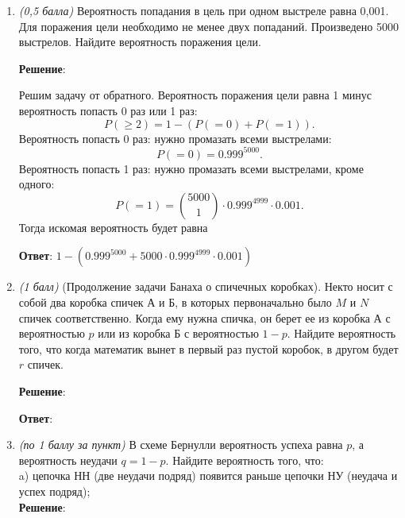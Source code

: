 \documentclass{article}
\begin{document}
\begin{enumerate}

    \item \textit{(0,5 балла)} Вероятность попадания в цель при одном выстреле равна 0,001. Для поражения цели необходимо не менее двух попаданий. Произведено 5000 выстрелов. Найдите вероятность поражения цели.
    
    \textbf{Решение}:

    Решим задачу от обратного. Вероятность поражения цели равна 1 минус вероятность попасть 0 раз или 1 раз:
    \begin{equation}
        P(\geq 2) = 1 - (P(=0) + P(=1)).
    \end{equation}
    Вероятность попасть 0 раз: нужно промазать всеми выстрелами:
    \begin{equation}
        P(=0) = 0.999^{5000}.
    \end{equation}
    Вероятность попасть 1 раз: нужно промазать всеми выстрелами, кроме одного:
    \begin{equation}
        P(=1) = \binom{5000}{1} \cdot 0.999^{4999} \cdot 0.001.
    \end{equation}
    Тогда искомая вероятность будет равна

    \textbf{Ответ}:
    $1 - (0.999^{5000} + 5000 \cdot 0.999^{4999} \cdot 0.001)$
    
    \item \textit{(1 балл)} (Продолжение задачи Банаха о спичечных коробках). Некто носит с собой два коробка спичек А и Б, в которых первоначально было $M$ и $N$ спичек соответственно. Когда ему нужна спичка, он берет ее из коробка А с вероятностью $p$ или из коробка Б с вероятностью $1-p$. Найдите вероятность того, что когда математик вынет в первый раз пустой коробок, в другом будет $r$ спичек.
    
    \textbf{Решение}:





    \textbf{Ответ}:
    
    \item \textit{(по 1 баллу за пункт)}  В схеме Бернулли вероятность успеха равна $p$, а вероятность неудачи $q = 1-p$. Найдите вероятность того, что:\\
    a) цепочка НН (две неудачи подряд) появится раньше цепочки НУ (неудача и успех подряд);\\

    \textbf{Решение}:






\end{enumerate}
\end{document}
